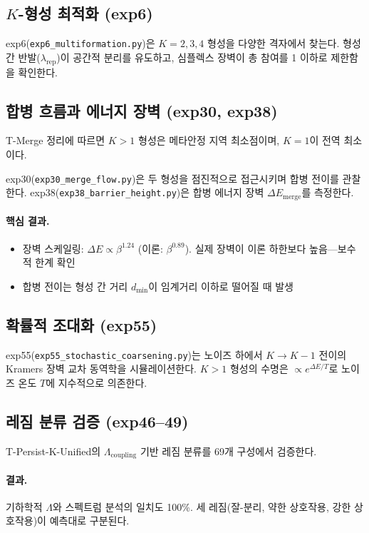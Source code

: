 \subsection{$K$-형성 최적화 (exp6)}

exp6(\texttt{exp6\_multiformation.py})은 $K = 2, 3, 4$ 형성을 다양한 격자에서 찾는다. 형성 간 반발($\lambda_{\mathrm{rep}}$)이 공간적 분리를 유도하고, 심플렉스 장벽이 총 참여를 1 이하로 제한함을 확인한다.

\subsection{합병 흐름과 에너지 장벽 (exp30, exp38)}

T-Merge 정리에 따르면 $K > 1$ 형성은 메타안정 지역 최소점이며, $K = 1$이 전역 최소이다.

exp30(\texttt{exp30\_merge\_flow.py})은 두 형성을 점진적으로 접근시키며 합병 전이를 관찰한다. exp38(\texttt{exp38\_barrier\_height.py})은 합병 에너지 장벽 $\Delta E_{\mathrm{merge}}$를 측정한다.

\paragraph{핵심 결과.}
\begin{itemize}
    \item 장벽 스케일링: $\Delta E \propto \beta^{1.24}$ (이론: $\beta^{0.89}$). 실제 장벽이 이론 하한보다 높음---보수적 한계 확인
    \item 합병 전이는 형성 간 거리 $d_{\min}$이 임계거리 이하로 떨어질 때 발생
\end{itemize}

\subsection{확률적 조대화 (exp55)}

exp55(\texttt{exp55\_stochastic\_coarsening.py})는 노이즈 하에서 $K \to K-1$ 전이의 Kramers 장벽 교차 동역학을 시뮬레이션한다. $K > 1$ 형성의 수명은 $\propto e^{\Delta E / T}$로 노이즈 온도 $T$에 지수적으로 의존한다.

\subsection{레짐 분류 검증 (exp46--49)}

T-Persist-K-Unified의 $\Lambda_{\mathrm{coupling}}$ 기반 레짐 분류를 69개 구성에서 검증한다.

\paragraph{결과.} 기하학적 $\Lambda$와 스펙트럼 분석의 일치도 100\%. 세 레짐(잘-분리, 약한 상호작용, 강한 상호작용)이 예측대로 구분된다.

